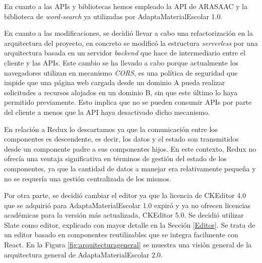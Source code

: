 En cuanto a las APIs y bibliotecas hemos empleado la API de ARASAAC y la biblioteca de \textit{word-search} ya utilizadas por AdaptaMaterialEscolar 1.0.

En cuanto a las modificaciones, se decidió llevar a cabo una refactorización en la arquitectura del proyecto, en concreto se modificó la estructura \textit{serverless} por una arquitectura basada en un servidor \textit{backend} que hace de intermediario entre el cliente y las APIs. Este cambio se ha llevado a cabo porque actualmente los navegadores utilizan en mecanismo \textit{CORS}, es una política de  seguridad que impide que una página web cargada desde un dominio A pueda realizar solicitudes a recursos alojados en un dominio B, sin que este último lo haya permitido previamente. Esto implica que no se pueden consumir APIs por parte del cliente a menos que la API haya desactivado dicho mecanismo.

En relación a Redux lo descartamos ya que la comunicación entre los componentes es descendente, es decir, los datos y el estado son transmitidos desde un componente padre a sus componentes hijos. En este contexto, Redux no ofrecía una ventaja significativa en términos de gestión del estado de los componentes, ya que la cantidad de datos a manejar era relativamente pequeña y no se requería una gestión centralizada de los mismos.

Por otra parte, se decidió cambiar el editor ya que la licencia de CKEditor 4.0 que se adquirió para AdaptaMaterialEscolar 1.0 expiró y ya no ofrecen licencias académicas para la versión más actualizada, CKEditor 5.0. Se decidió utilizar Slate como editor, explicado con mayor detalle en la Sección \ref{Editor}. Se trata de un editor basado en componentes reutilizables que se integra facilmente con React. En la Figura \ref{fig:arquitecturageneral} se muestra una visión general de la arquitectura general de AdaptaMaterialEscolar 2.0.

